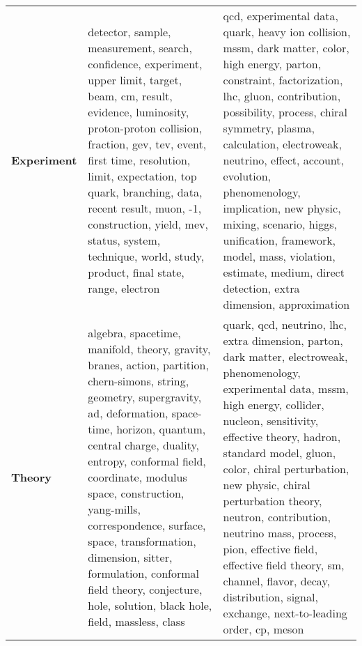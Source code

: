 \begin{longtable}{p{3cm}|p{5cm}|p{5cm}}
\bottomrule
\endlastfoot
\textbf{Experiment} &                                                              detector, sample, measurement, search, confidence, experiment, upper limit, target, beam, cm, result, evidence, luminosity, proton-proton collision, fraction, gev, tev, event, first time, resolution, limit, expectation, top quark, branching, data, recent result, muon, -1, construction, yield, mev, status, system, technique, world, study, product, final state, range, electron &                          qcd, experimental data, quark, heavy ion collision, mssm, dark matter, color, high energy, parton, constraint, factorization, lhc, gluon, contribution, possibility, process, chiral symmetry, plasma, calculation, electroweak, neutrino, effect, account, evolution, phenomenology, implication, new physic, mixing, scenario, higgs, unification, framework, model, mass, violation, estimate, medium, direct detection, extra dimension, approximation \\
\textbf{Theory    } &  algebra, spacetime, manifold, theory, gravity, branes, action, partition, chern-simons, string, geometry, supergravity, ad, deformation, space-time, horizon, quantum, central charge, duality, entropy, conformal field, coordinate, modulus space, construction, yang-mills, correspondence, surface, space, transformation, dimension, sitter, formulation, conformal field theory, conjecture, hole, solution, black hole, field, massless, class &  quark, qcd, neutrino, lhc, extra dimension, parton, dark matter, electroweak, phenomenology, experimental data, mssm, high energy, collider, nucleon, sensitivity, effective theory, hadron, standard model, gluon, color, chiral perturbation, new physic, chiral perturbation theory, neutron, contribution, neutrino mass, process, pion, effective field, effective field theory, sm, channel, flavor, decay, distribution, signal, exchange, next-to-leading order, cp, meson \\
\end{longtable}

